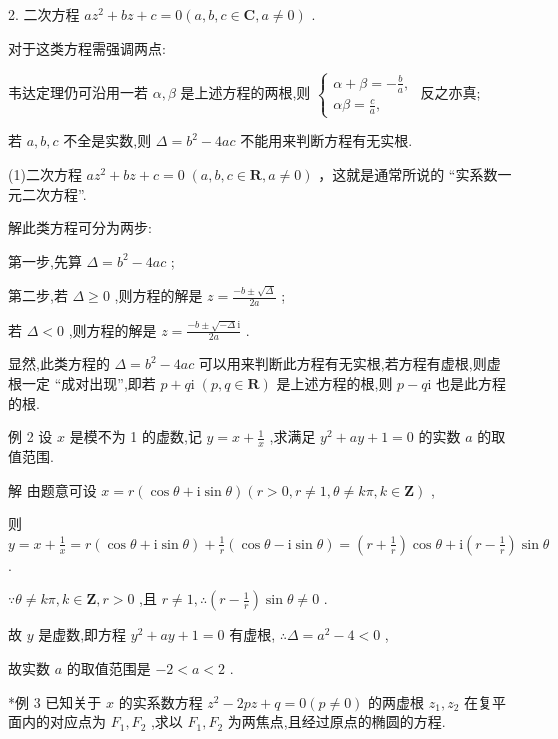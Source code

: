 \documentclass[10pt]{article}
\begin{document}
2. 二次方程 \(a{z}^{2} + {bz} + c = 0\left( {a,b,c \in  \mathbf{C},a \neq  0}\right)\) .

对于这类方程需强调两点:

韦达定理仍可沿用一若 \(\alpha ,\beta\) 是上述方程的两根,则 \(\left\{  \begin{array}{l} \alpha  + \beta  =  - \frac{b}{a}, \\  {\alpha \beta } = \frac{c}{a}, \end{array}\right.\) 反之亦真;

若 \(a,b,c\) 不全是实数,则 \(\Delta  = {b}^{2} - {4ac}\) 不能用来判断方程有无实根.

(1)二次方程 \(a{z}^{2} + {bz} + c = 0\;\left( {a,b,c \in  \mathbf{R},a \neq  0}\right)\) ，这就是通常所说的 “实系数一元二次方程”.

解此类方程可分为两步:

第一步,先算 \(\Delta  = {b}^{2} - {4ac}\) ;

第二步,若 \(\Delta  \geq  0\) ,则方程的解是 \(z = \frac{-b \pm  \sqrt{\Delta }}{2a}\) ;

若 \(\Delta  < 0\) ,则方程的解是 \(z = \frac{-b \pm  \sqrt{-\Delta }\mathrm{i}}{2a}\) .

显然,此类方程的 \(\Delta  = {b}^{2} - {4ac}\) 可以用来判断此方程有无实根,若方程有虚根,则虚根一定 “成对出现”,即若 \(p + q\mathrm{i}\;\left( {p,q \in  \mathbf{R}}\right)\) 是上述方程的根,则 \(p - q\mathrm{i}\) 也是此方程的根.

例 2 设 \(x\) 是模不为 1 的虚数,记 \(y = x + \frac{1}{x}\) ,求满足 \({y}^{2} + {ay} + 1 = 0\) 的实数 \(a\) 的取值范围.

解 由题意可设 \(x = r\left( {\cos \theta  + \mathrm{i}\sin \theta }\right) \left( {r > 0,r \neq  1,\theta  \neq  {k\pi },k \in  \mathbf{Z}}\right)\) ,

则 \(y = x + \frac{1}{x} = r\left( {\cos \theta  + \mathrm{i}\sin \theta }\right)  + \frac{1}{r}\left( {\cos \theta  - \mathrm{i}\sin \theta }\right)  = \left( {r + \frac{1}{r}}\right) \cos \theta  + \mathrm{i}\left( {r - \frac{1}{r}}\right) \sin \theta\) .

\(\because \theta  \neq  {k\pi },k \in  \mathbf{Z},r > 0\) ,且 \(r \neq  1,\therefore \left( {r - \frac{1}{r}}\right) \sin \theta  \neq  0\) .

故 \(y\) 是虚数,即方程 \({y}^{2} + {ay} + 1 = 0\) 有虚根, \(\therefore \Delta  = {a}^{2} - 4 < 0\) ,

故实数 \(a\) 的取值范围是 \(- 2 < a < 2\) .

*例 3 已知关于 \(x\) 的实系数方程 \({z}^{2} - {2pz} + q = 0\left( {p \neq  0}\right)\) 的两虚根 \({z}_{1},{z}_{2}\) 在复平面内的对应点为 \({F}_{1},{F}_{2}\) ,求以 \({F}_{1},{F}_{2}\) 为两焦点,且经过原点的椭圆的方程.
\end{document}
